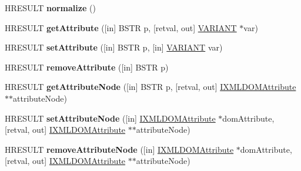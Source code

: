 \begin{DoxyCompactItemize}
H\+R\+E\+S\+U\+LT {\bfseries normalize} ()
\item 
\mbox{\label{interface_m_s_x_m_l2_1_1_i_x_m_l_d_o_m_element_a142219db63abe9f5df5a3afdf2ac6cdd}} 
H\+R\+E\+S\+U\+LT {\bfseries get\+Attribute} (\mbox{[}in\mbox{]} B\+S\+TR p, \mbox{[}retval, out\mbox{]} \hyperlink{structtag_v_a_r_i_a_n_t}{V\+A\+R\+I\+A\+NT} $\ast$var)
\item 
\mbox{\label{interface_m_s_x_m_l2_1_1_i_x_m_l_d_o_m_element_ad6258a45fab2c53f69569f0e7194b4c5}} 
H\+R\+E\+S\+U\+LT {\bfseries set\+Attribute} (\mbox{[}in\mbox{]} B\+S\+TR p, \mbox{[}in\mbox{]} \hyperlink{structtag_v_a_r_i_a_n_t}{V\+A\+R\+I\+A\+NT} var)
\item 
\mbox{\label{interface_m_s_x_m_l2_1_1_i_x_m_l_d_o_m_element_ab235c8d8a0ceeae7785d25eb34896b5c}} 
H\+R\+E\+S\+U\+LT {\bfseries remove\+Attribute} (\mbox{[}in\mbox{]} B\+S\+TR p)
\item 
\mbox{\label{interface_m_s_x_m_l2_1_1_i_x_m_l_d_o_m_element_a6654967474f2f49af78325989cabb8f6}} 
H\+R\+E\+S\+U\+LT {\bfseries get\+Attribute\+Node} (\mbox{[}in\mbox{]} B\+S\+TR p, \mbox{[}retval, out\mbox{]} \hyperlink{interface_m_s_x_m_l2_1_1_i_x_m_l_d_o_m_attribute}{I\+X\+M\+L\+D\+O\+M\+Attribute} $\ast$$\ast$attribute\+Node)
\item 
\mbox{\label{interface_m_s_x_m_l2_1_1_i_x_m_l_d_o_m_element_aaaf8e1556fbaafd93fdf02c51c0fea9a}} 
H\+R\+E\+S\+U\+LT {\bfseries set\+Attribute\+Node} (\mbox{[}in\mbox{]} \hyperlink{interface_m_s_x_m_l2_1_1_i_x_m_l_d_o_m_attribute}{I\+X\+M\+L\+D\+O\+M\+Attribute} $\ast$dom\+Attribute, \mbox{[}retval, out\mbox{]} \hyperlink{interface_m_s_x_m_l2_1_1_i_x_m_l_d_o_m_attribute}{I\+X\+M\+L\+D\+O\+M\+Attribute} $\ast$$\ast$attribute\+Node)
\item 
\mbox{\label{interface_m_s_x_m_l2_1_1_i_x_m_l_d_o_m_element_a9c92f88f61011fb9e5811f0e1bf07ff9}} 
H\+R\+E\+S\+U\+LT {\bfseries remove\+Attribute\+Node} (\mbox{[}in\mbox{]} \hyperlink{interface_m_s_x_m_l2_1_1_i_x_m_l_d_o_m_attribute}{I\+X\+M\+L\+D\+O\+M\+Attribute} $\ast$dom\+Attribute, \mbox{[}retval, out\mbox{]} \hyperlink{interface_m_s_x_m_l2_1_1_i_x_m_l_d_o_m_attribute}{I\+X\+M\+L\+D\+O\+M\+Attribute} $\ast$$\ast$attribute\+Node)
$$
\end{DoxyCompactItemize}
